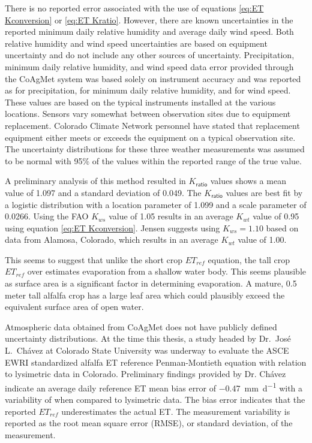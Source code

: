 \begin{linenumbers}
There is no reported error associated with the use of equations \ref{eq:ET Kconversion} or \ref{eq:ET Kratio}.  However, there are known uncertainties in the reported minimum daily relative humidity and average daily wind speed.  Both relative humidity and wind speed uncertainties are based on equipment uncertainty and do not include any other sources of uncertainty.  Precipitation, minimum daily relative humidity, and wind speed data error provided through the CoAgMet system was based solely on instrument accuracy and was reported as  for precipitation,  for minimum daily relative humidity, and  for wind speed.  These values are based on the typical instruments installed at the various locations.  Sensors vary somewhat between observation sites due to equipment replacement.  Colorado Climate Network personnel have stated that replacement equipment either meets or exceeds the equipment on a typical observation site.  The uncertainty distributions for these three weather measurements was assumed to be normal with 95\% of the values within the reported range of the true value.

A preliminary analysis of this method resulted in $K_\mathsf{ratio}$ values shows a mean value of 1.097 and a standard deviation of 0.049.  The $K_\mathsf{ratio}$ values are best fit by a logistic distribution with a location parameter of 1.099 and a scale parameter of 0.0266.  Using the FAO $K_{ws}$ value of 1.05 results in an average $K_{wt}$ value of 0.95 using equation \ref{eq:ET Kconversion}.  Jensen suggests using $K_{ws}=1.10$ based on data from Alamosa, Colorado, which results in an average $K_{wt}$ value of 1.00.

This seems to suggest that unlike the short crop $ET_{ref}$ equation, the tall crop $ET_{ref}$ over estimates evaporation from a shallow water body.  This seems plausible as surface area is a significant factor in determining evaporation.  A mature, 0.5 meter tall alfalfa crop has a large leaf area which could plausibly exceed the equivalent surface area of open water.  

Atmospheric data obtained from CoAgMet does not have publicly defined uncertainty distributions.  At the time this thesis, a study headed by Dr.\ Jos\'{e} L.\ Ch\'{a}vez at Colorado State University was underway to evaluate the ASCE EWRI standardized alfalfa ET reference Penman-Montieth equation with relation to lysimetric data in Colorado.  Preliminary findings provided by Dr. Ch\'{a}vez indicate an average daily reference ET mean bias error of \SI{-0.47}{\milli\meter\per\day} with a variability of  when compared to lysimetric data.  The bias error indicates that the reported $ET_{ref}$ underestimates the actual ET.  The measurement variability is reported as the root mean square error (RMSE), or standard deviation, of the measurement.


\end{linenumbers}
